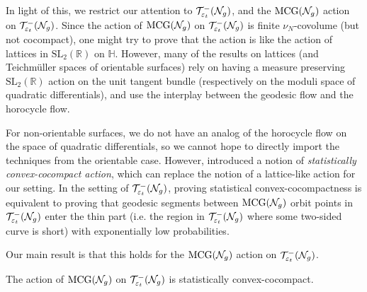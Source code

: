 
In light of this, we restrict our attention to $\mathcal{T}_{\varepsilon_t}^{-}(\mathcal{N}_g)$, and the $\mathrm{MCG}(\mathcal{N}_g)$ action on $\mathcal{T}_{\varepsilon_t}^{-}(\mathcal{N}_g)$.
Since the action of $\mathrm{MCG}(\mathcal{N}_g)$ on $\mathcal{T}_{\varepsilon_t}^{-}(\mathcal{N}_g)$ is finite $\nu_N$-covolume (but not cocompact), one might try to prove that the action is
{like}
the action of lattices in $\mathrm{SL}_2(\mathbb{R})$ on $\mathbb{H}$.
However, many of the results on lattices (and Teichmüller spaces of orientable surfaces) rely on having a measure preserving $\mathrm{SL}_2(\mathbb{R})$ action on the unit tangent bundle (respectively on the moduli space of quadratic differentials), and use the interplay between the geodesic flow and the horocycle flow.

For non-orientable surfaces, we do not have an analog of the horocycle flow on the space of quadratic differentials, so we cannot hope to directly import the techniques from the orientable case.
However, \textcite{10.1093/imrn/rny001} introduced a notion of \emph{statistically convex-cocompact action}, which can replace the notion of a lattice-like action for our setting.
In the setting of $\mathcal{T}_{\varepsilon_t}^{-}(\mathcal{N}_g)$, proving statistical convex-cocompactness is equivalent to proving that geodesic segments between $\mathrm{MCG}(\mathcal{N}_g)$ orbit points in $\mathcal{T}_{\varepsilon_t}^{-}(\mathcal{N}_g)$ enter the thin part (i.e. the region in $\mathcal{T}_{\varepsilon_t}^{-}(\mathcal{N}_g)$ where some two-sided curve is short) with exponentially low probabilities.

Our main result is that this holds for the $\mathrm{MCG}(\mathcal{N}_g)$ action on $\mathcal{T}_{\varepsilon_t}^{-}(\mathcal{N}_g)$.
\begin{theorem}
  \label{thm:statistical-convex-cocompactness}
  The action of $\mathrm{MCG}(\mathcal{N}_g)$ on $\mathcal{T}_{\varepsilon_t}^{-}(\mathcal{N}_g)$ is statistically convex-cocompact.
\end{theorem}

